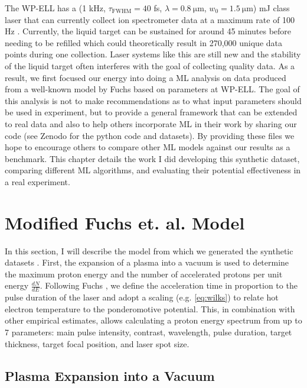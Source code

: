 The \gls{WP-ELL} has a (1 kHz, $\tau_\text{FWHM} = 40$ fs, $\lambda = \SI{0.8}{\micro \meter}$, $w_0 = \SI{1.5}{\micro \meter}$) mJ class laser that can currently collect ion spectrometer data at a maximum rate of 100 Hz \cite{George_2019_HPLSE}. Currently, the liquid target can be sustained for around 45 minutes before needing to be refilled which could theoretically result in 270,000 unique data points during one collection. Laser systems like this are still new and the stability of the liquid target often interferes with the goal of collecting quality data. As a result, we first focused our energy into doing a \gls{ML} analysis on data produced from a well-known model by Fuchs \cite{Fuchs_2005_Nat} based on parameters at \gls{WP-ELL}. The goal of this analysis is not to make recommendations as to what input parameters should be used in experiment, but to provide a general framework that can be extended to real data and also to help others incorporate \gls{ML} in their work by sharing our code (see Zenodo \cite{Desai_2024_Zenodo, Desai_2025_Zenodo} for the python code and datasets). By providing these files we hope to encourage others to compare other ML models against our results as a benchmark. This chapter details the work I did developing this synthetic dataset, comparing different \gls{ML} algorithms, and evaluating their potential effectiveness in a real experiment. 

\section{Modified Fuchs et. al. Model} \label{sec:fuchs_model}

In this section, I will describe the model from which we generated the synthetic datasets \cite{Desai_2024_CPP, Desai_2025_APL}. First, the expansion of a plasma into a vacuum \cite{Mora_2003_PRL} is used to determine the maximum proton energy and the number of accelerated protons per unit energy $\frac{dN}{dE}$. Following Fuchs \cite{Fuchs_2005_Nat}, we define the acceleration time in proportion to the pulse duration of the laser and adopt a scaling (e.g. \cref{eq:wilks}) to relate hot electron temperature to the ponderomotive potential. This, in combination with other empirical estimates, allows calculating a proton energy spectrum from up to 7 parameters: main pulse intensity, contrast, wavelength, pulse duration, target thickness, target focal position, and laser spot size.

\subsection{Plasma Expansion into a Vacuum}

